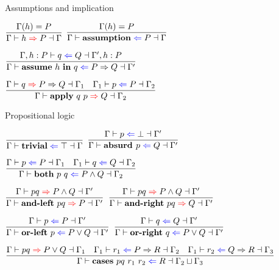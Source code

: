 \begin{frame}{Assumptions and implication}

\begin{center}
  $\infrule{\findhyp{\Gamma}{h}{P}}{\inferproof{\Gamma}{h}{P}{\Gamma}}$ \quad
  $\infrule{\findhyp{\Gamma}{h}{P}}{\checkproof{\Gamma}{\assumption}{P}{\Gamma}}$

  \vspace{2em}

  $\infrule{\checkproof{\assume{\Gamma}{h}{P}}{q}{Q}{\assume{\Gamma'}{h}{P}}}{\checkproof{\Gamma}{\implintro{h}{q}}{\Impl{P}{Q}}{\Gamma'}}$

  \vspace{2em}

  $\infrule{\inferproof{\Gamma}{q}{\Impl{P}{Q}}{\Gamma_1} \quad \checkproof{\Gamma_1}{p}{P}{\Gamma_2}}{\inferproof{\Gamma}{\implelim{q}{p}}{Q}{\Gamma_2}}$
\end{center}

\end{frame}

\begin{frame}{Propositional logic}

\begin{center}
  $\infrule{}{\checkproof{\Gamma}{\trueintro}{\True}{\Gamma}}$ \quad
  $\infrule{\checkproof{\Gamma}{p}{\False}{\Gamma'}}{\checkproof{\Gamma}{\falseelim{p}}{Q}{\Gamma'}}$

  \vspace{1em}

  $\infrule{\checkproof{\Gamma}{p}{P}{\Gamma_1} \quad \checkproof{\Gamma_1}{q}{Q}{\Gamma_2}}{\checkproof{\Gamma}{\andintro{p}{q}}{\And{P}{Q}}{\Gamma_2}}$

  \vspace{1em}

  $\infrule{\inferproof{\Gamma}{pq}{\And{P}{Q}}{\Gamma'}}{\inferproof{\Gamma}{\andeliml{pq}}{P}{\Gamma'}}$ \quad
  $\infrule{\inferproof{\Gamma}{pq}{\And{P}{Q}}{\Gamma'}}{\inferproof{\Gamma}{\andelimr{pq}}{Q}{\Gamma'}}$

  \vspace{1em}

  $\infrule{\checkproof{\Gamma}{p}{P}{\Gamma'}}{\checkproof{\Gamma}{\orintrol{p}}{\Or{P}{Q}}{\Gamma'}}$ \quad
  $\infrule{\checkproof{\Gamma}{q}{Q}{\Gamma'}}{\checkproof{\Gamma}{\orintror{q}}{\Or{P}{Q}}{\Gamma'}}$

  \vspace{1em}

  $\infrule{\inferproof{\Gamma}{pq}{\Or{P}{Q}}{\Gamma_1} \quad \checkproof{\Gamma_1}{r_1}{\Impl{P}{R}}{\Gamma_2} \quad \checkproof{\Gamma_1}{r_2}{\Impl{Q}{R}}{\Gamma_3}}{\checkproof{\Gamma}{\orelim{pq}{r_1}{r_2}}{R}{\lubctx{\Gamma_2}{\Gamma_3}}}$

\end{center}

\end{frame}

